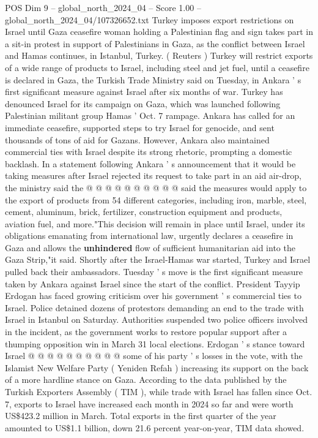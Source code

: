 \begin{textsample}{POS Dim 9 – global\_north\_2024\_04 – Score 1.00 – global\_north\_2024\_04/107326652.txt}  \label{ex:f9_pos_235}
Turkey imposes export restrictions on Israel until Gaza ceasefire woman holding a Palestinian flag and sign takes part in a sit-in protest in support of Palestinians in Gaza, as the conflict between Israel and Hamas continues, in Istanbul, Turkey. ( Reuters ) Turkey will restrict exports of a wide range of products to Israel, including steel and jet fuel, until a ceasefire is declared in Gaza, the Turkish Trade Ministry said on Tuesday, in Ankara ' s first significant measure against Israel after six months of war.
Turkey has denounced Israel for its campaign on Gaza, which was launched following Palestinian militant group Hamas ' Oct. 7 rampage.
Ankara has called for an immediate ceasefire, supported steps to try Israel for genocide, and sent thousands of tons of aid for Gazans.
However, Ankara also maintained commercial ties with Israel despite its strong rhetoric, prompting a domestic backlash.
In a statement following Ankara ' s announcement that it would be taking measures after Israel rejected its request to take part in an aid air-drop, the ministry said the @ @ @ @ @ @ @ @ @ @ said the measures would apply to the export of products from 54 different categories, including iron, marble, steel, cement, aluminum, brick, fertilizer, construction equipment and products, aviation fuel, and more."This decision will remain in place until Israel, under its obligations emanating from international law, urgently declares a ceasefire in Gaza and allows the \textbf{unhindered} flow of sufficient humanitarian aid into the Gaza Strip,"it said.
Shortly after the Israel-Hamas war started, Turkey and Israel pulled back their ambassadors.
Tuesday ' s move is the first significant measure taken by Ankara against Israel since the start of the conflict.
President Tayyip Erdogan has faced growing criticism over his government ' s commercial ties to Israel.
Police detained dozens of protestors demanding an end to the trade with Israel in Istanbul on Saturday.
Authorities suspended two police officers involved in the incident, as the government works to restore popular support after a thumping opposition win in March 31 local elections.
Erdogan ' s stance toward Israel @ @ @ @ @ @ @ @ @ @ some of his party ' s losses in the vote, with the Islamist New Welfare Party ( Yeniden Refah ) increasing its support on the back of a more hardline stance on Gaza.
According to the data published by the Turkish Exporters Assembly ( TIM ), while trade with Israel has fallen since Oct. 7, exports to Israel have increased each month in 2024 so far and were worth US\$423.2 million in March.
Total exports in the first quarter of the year amounted to US\$1.1 billion, down 21.6 percent year-on-year, TIM data showed.

\end{textsample}
